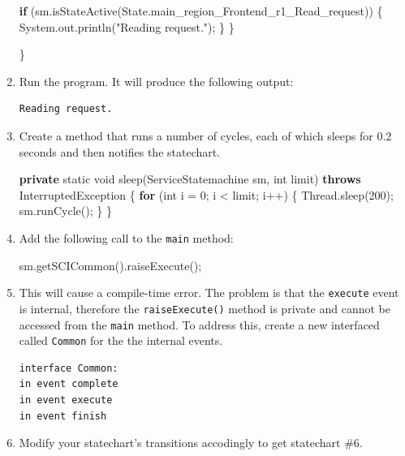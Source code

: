 \documentclass[]{report}
\newenvironment{Shaded}{}{}
\newcommand{\KeywordTok}[1]{\textcolor[rgb]{0.00,0.44,0.13}{\textbf{{#1}}}}
\newcommand{\DataTypeTok}[1]{\textcolor[rgb]{0.56,0.13,0.00}{{#1}}}
\newcommand{\DecValTok}[1]{\textcolor[rgb]{0.25,0.63,0.44}{{#1}}}
\newcommand{\StringTok}[1]{\textcolor[rgb]{0.25,0.44,0.63}{{#1}}}
\newcommand{\FunctionTok}[1]{\textcolor[rgb]{0.02,0.16,0.49}{{#1}}}
\newcommand{\NormalTok}[1]{{#1}}
\begin{document}
\begin{enumerate}
\begin{Shaded}
\begin{Highlighting}[]
    \KeywordTok{if} \NormalTok{(sm.}\FunctionTok{isStateActive}\NormalTok{(State.}\FunctionTok{main_region_Frontend_r1_Read_request}\NormalTok{)) \{}
      \NormalTok{System.}\FunctionTok{out}\NormalTok{.}\FunctionTok{println}\NormalTok{(}\StringTok{"Reading request."}\NormalTok{);}
    \NormalTok{\}}
  \NormalTok{\}}

\NormalTok{\}}
\end{Highlighting}
\end{Shaded}
\item
  Run the program. It will produce the following output:

\begin{verbatim}
Reading request.
\end{verbatim}
\item
  Create a method that runs a number of cycles, each of which sleeps for
  0.2 seconds and then notifies the statechart.

\begin{Shaded}
\begin{Highlighting}[]
\KeywordTok{private} \DataTypeTok{static} \DataTypeTok{void} \FunctionTok{sleep}\NormalTok{(ServiceStatemachine sm, }\DataTypeTok{int} \NormalTok{limit)}
    \KeywordTok{throws} \NormalTok{InterruptedException \{}
  \KeywordTok{for} \NormalTok{(}\DataTypeTok{int} \NormalTok{i = }\DecValTok{0}\NormalTok{; i < limit; i++) \{}
    \NormalTok{Thread.}\FunctionTok{sleep}\NormalTok{(}\DecValTok{200}\NormalTok{);}
    \NormalTok{sm.}\FunctionTok{runCycle}\NormalTok{();}
  \NormalTok{\}}
\NormalTok{\}}
\end{Highlighting}
\end{Shaded}
\item
  Add the following call to the \texttt{main} method:

\begin{Shaded}
\begin{Highlighting}[]
\NormalTok{sm.}\FunctionTok{getSCICommon}\NormalTok{().}\FunctionTok{raiseExecute}\NormalTok{();}
\end{Highlighting}
\end{Shaded}
\item
  This will cause a compile-time error. The problem is that the
  \texttt{execute} event is internal, therefore the
  \texttt{raiseExecute()} method is private and cannot be accessed from
  the \texttt{main} method. To address this, create a new interfaced
  called \texttt{Common} for the the internal events.

\begin{verbatim}
interface Common:
in event complete
in event execute
in event finish
\end{verbatim}
\item
  Modify your statechart's transitions accodingly to get statechart \#6.


\end{enumerate}
\end{document}
